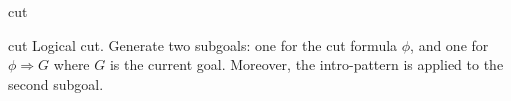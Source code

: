 \begin{tactic}{cut}
  \begin{tsyntax}[empty]{cut}
  Logical cut. Generate two subgoals: one for the cut formula $\phi$,
  and one for $\phi \Rightarrow G$ where $G$ is the current goal. Moreover,
  the intro-pattern \ec{$\iota$} is applied to the second subgoal.
  \end{tsyntax}
\end{tactic}
